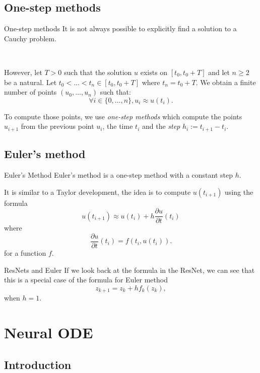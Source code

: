 \documentclass[11pt]{beamer}
\begin{document}
\subsection{One-step methods}
\begin{frame}{One-step methods}
It is not always possible to explicitly find a solution to a Cauchy problem. 

~

However, let $T > 0$ such that the solution $u$ exists on $[t_0, t_0 + T]$ and let $n \geqslant 2$ be a natural. Let  $t_0 < ... < t_n \in [t_0, t_0 + T]$ where $t_n = t_0 + T$. We obtain a finite number of points $(u_0, \dots, u_n)$ such that:
$$
\forall i\in \{0,\dots, n\},  u_i \approx u(t_i).
$$

To compute those points, we use \textit{one-step methods} which compute the points $u_{i+1}$ from the previous point $u_i$, the time $t_i$ and the \textit{step} $h_i := t_{i+1} - t_i$.
\end{frame}

\subsection{Euler's method} \label{euler}
\begin{frame}{Euler's Method}
Euler's method is a one-step method with a constant step $h$. 

It is similar to a Taylor development, the idea is to compute $u(t_{i+1})$ using the formula
\begin{equation}\label{eqeuler}
u(t_{i+1}) \approx u(t_i) + h\frac{\partial u}{\partial t}(t_i)
\end{equation}
where 
$$
\frac{\partial u}{\partial t}(t_i) = f(t_i, u(t_i)).
$$
for a function $f$.
\end{frame}

\begin{frame}{ResNets and Euler}
If we look back at the formula in the ResNet, we can see
that this is a special case of the formula for Euler method
\begin{equation*}
z_{k+1} = z_k + hf_k(z_k),
\end{equation*}
when $h = 1$.

\end{frame}

\section{Neural ODE} \label{neuralode}
\subsection{Introduction}
\end{document}
